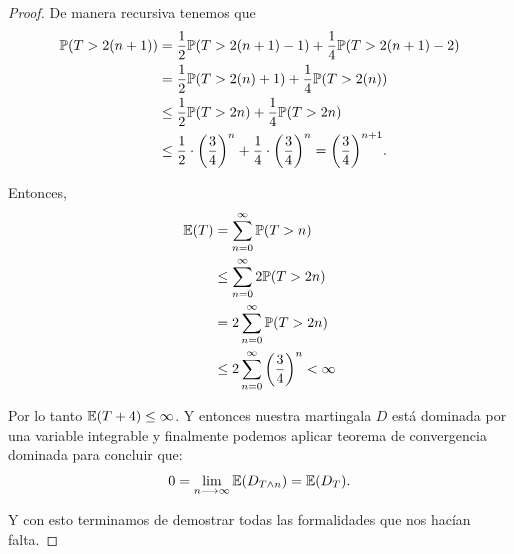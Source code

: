 \begin{proof}
		    De manera recursiva tenemos que
		    \begin{align}
		       	\mathbb{P}(T > 2(n+1)) &=     \frac{1}{2} \mathbb{P}(T > 2(n+1) - 1) + \frac{1}{4} \mathbb{P}(T > 2(n+1) - 2) \\
						       	&=     \frac{1}{2} \mathbb{P}(T > 2(n) + 1) + \frac{1}{4} \mathbb{P}(T > 2(n)) \\
		       				   &\leq  \frac{1}{2} \mathbb{P}(T > 2n) + \frac{1}{4} \mathbb{P}(T > 2n) \\
		       				   &\leq  \frac{1}{2} \cdot \bigg(\frac{3}{4}\bigg)^{n} + \frac{1}{4} \cdot \bigg(\frac{3}{4}\bigg)^{n} = 		
		       				   \bigg(\frac{3}{4}\bigg)^{n+1}.
		    \end{align}
		    
		    Entonces,
		    \begin{align}
		    	\mathbb{E}(T) 	&= 		\sum_{n=0}^\infty \mathbb{P}(T > n) \\
		    			&\leq 	\sum_{n=0}^\infty 2\mathbb{P}(T > 2n) \\
		    			&= 		2 \sum_{n=0}^\infty \mathbb{P}(T > 2n) \\
		    			&\leq 	2 \sum_{n=0}^\infty \bigg(\frac{3}{4}\bigg)^{n} < \infty\\
		    \end{align}
		    
		    Por lo tanto $\mathbb{E}(T + 4) \leq \infty$. Y entonces nuestra martingala $D$ está dominada por una variable integrable y finalmente
		    podemos aplicar teorema de convergencia dominada para concluir que:
		    \begin{align}
		    	0 = \lim_{n \longrightarrow \infty} \mathbb{E}(D_{T \wedge n}) = \mathbb{E}(D_T).
		    \end{align}
		    
		    Y con esto terminamos de demostrar todas las formalidades que nos hacían falta.
\end{proof}